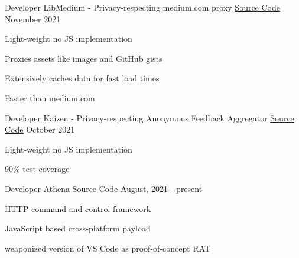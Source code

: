 \begin{cventries}
  \cventry
	{Developer}
	{LibMedium - Privacy-respecting medium.com proxy}
	{\href{https://github.com/realaravinth/libmedium}{Source Code}}
	{November 2021}
	{
		\begin{cvitems}
			\item {Light-weight no JS implementation}
			\item {Proxies assets like images and GitHub gists}
			\item {Extensively caches data for fast load times}
			\item {Faster than medium.com}
		\end{cvitems}
	}

  \cventry
	{Developer}
	{Kaizen - Privacy-respecting Anonymous Feedback Aggregator}
	{\href{https://github.com/realaravinth/kaizen}{Source Code}}
	{October 2021}
	{
		\begin{cvitems}
			\item {Light-weight no JS implementation}
			\item {90\% test coverage}
		\end{cvitems}
	}

  \cventry
    {Developer} %
    {Athena} %
    {\href{https://github.com/realaravinth/athena}{Source Code}} %
    {August, 2021 - present} %
    {
      \begin{cvitems} %
        \item {HTTP command and control framework}
        \item {JavaScript based cross-platform payload}
        \item {weaponized version of VS Code as proof-of-concept RAT}
      \end{cvitems}
    }
  

\end{cventries}
